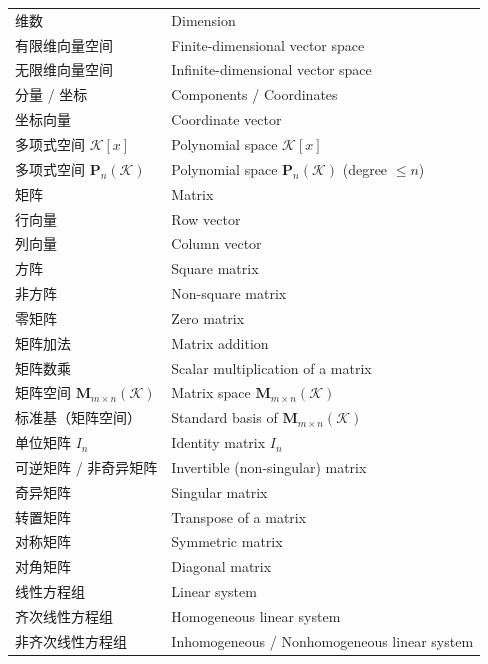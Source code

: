 \documentclass{ctexart}
\begin{document}
\begin{center}
\begin{longtable}{|>{\raggedright\arraybackslash}p{5cm}|>{\raggedright\arraybackslash}p{8cm}|}
			维数 & Dimension \\
			有限维向量空间 & Finite-dimensional vector space \\
			无限维向量空间 & Infinite-dimensional vector space \\
			分量 / 坐标 & Components / Coordinates \\
			坐标向量 & Coordinate vector \\
			多项式空间 $\mathcal{K}[x]$ & Polynomial space $\mathcal{K}[x]$ \\
			多项式空间 $\mathbf P_n(\mathcal{K})$ & Polynomial space $\mathbf P_n(\mathcal{K})$ (degree $\le n$) \\
			矩阵 & Matrix \\
			行向量 & Row vector \\
			列向量 & Column vector \\
			方阵 & Square matrix \\
			非方阵 & Non-square matrix \\
			零矩阵 & Zero matrix \\
			矩阵加法 & Matrix addition \\
			矩阵数乘 & Scalar multiplication of a matrix \\
			矩阵空间 $\mathbf{M}_{m\times n}(\mathcal{K})$ & Matrix space $\mathbf{M}_{m\times n}(\mathcal{K})$ \\
			标准基（矩阵空间） & Standard basis of $\mathbf{M}_{m\times n}(\mathcal{K})$ \\
			单位矩阵 $I_n$ & Identity matrix $I_n$ \\
			可逆矩阵 / 非奇异矩阵 & Invertible (non-singular) matrix \\
			奇异矩阵 & Singular matrix \\
			转置矩阵 & Transpose of a matrix \\
			对称矩阵 & Symmetric matrix \\
			对角矩阵 & Diagonal matrix \\
			线性方程组 & Linear system \\
			齐次线性方程组 & Homogeneous linear system \\
			非齐次线性方程组 & Inhomogeneous / Nonhomogeneous linear system \\

\end{longtable}
\end{center}
\end{document}
